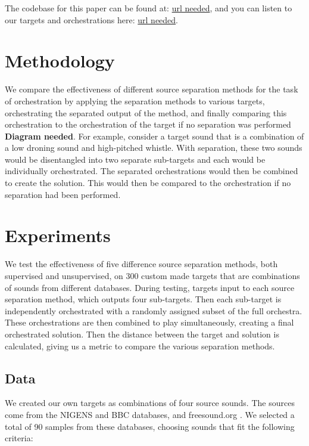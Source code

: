 \documentclass{article}
\begin{document}
	The codebase for this paper can be found at: \url{url needed}, and you can listen to our targets and orchestrations here: \url{url needed}.
		
	
	\section{Methodology}\label{sec:methodology}
	
		
	We compare the effectiveness of different source separation methods for the task of orchestration by applying the separation methods to various targets, orchestrating the separated output of the method, and finally comparing this orchestration to the orchestration of the target if no separation was performed \textbf{Diagram needed}. For example, consider a target sound that is a combination of a low droning sound and high-pitched whistle. With separation, these two sounds would be disentangled into two separate sub-targets and each would be individually orchestrated. The separated orchestrations would then be combined to create the solution. This would then be compared to the orchestration if no separation had been performed.
	
	
	\section{Experiments}\label{sec:experiments}
	
	We test the effectiveness of five difference source separation methods, both supervised and unsupervised, on 300 custom made targets that are combinations of sounds from different databases. During testing, targets input to each source separation method, which outputs four sub-targets. Then each sub-target is independently orchestrated with a randomly assigned subset of the full orchestra. These orchestrations are then combined to play simultaneously, creating a final orchestrated solution. Then the distance between the target and solution is calculated, giving us a metric to compare the various separation methods.
	
		\subsection{Data}\label{subsec:data}
		We created our own targets as combinations of four source sounds. The sources come from the NIGENS \cite{NIGENS} and BBC \cite{BBC} databases, and freesound.org \cite{freesound}. We selected a total of 90 samples from these databases, choosing sounds that fit the following criteria: 
		
\end{document}
